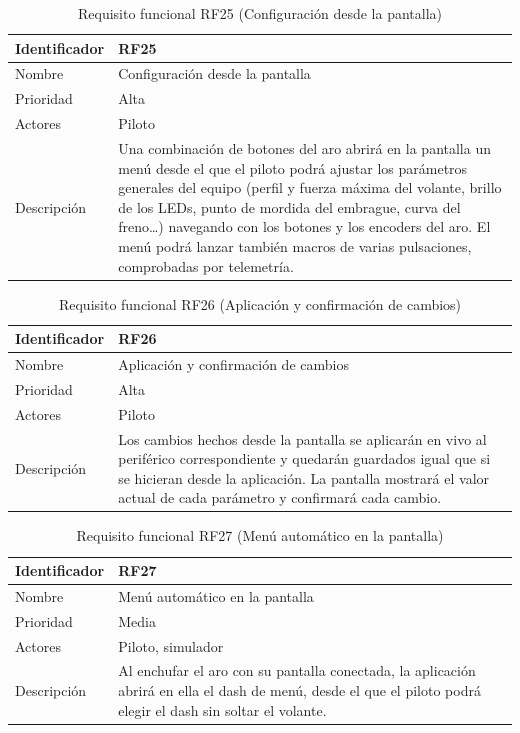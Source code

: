 \begin{table}[H]
	\centering
	\renewcommand{\arraystretch}{2}
	\begin{tabular}{|l|p{10cm}|}
		\hline
		Identificador & RF25 \\
		\hline
		Nombre & Configuración desde la pantalla \\
		\hline
		Prioridad & Alta \\
		\hline
		Actores & Piloto \\
		\hline
		Descripción & Una combinación de botones del aro abrirá en la pantalla un menú desde el que el piloto podrá ajustar los parámetros generales del equipo (perfil y fuerza máxima del volante, brillo de los LEDs, punto de mordida del embrague, curva del freno\ldots) navegando con los botones y los encoders del aro. El menú podrá lanzar también macros de varias pulsaciones, comprobadas por telemetría. \\
		\hline
	\end{tabular}
	\caption{Requisito funcional RF25 (Configuración desde la pantalla)}
	\label{tab:rf25}
\end{table}

\begin{table}[H]
	\centering
	\renewcommand{\arraystretch}{2}
	\begin{tabular}{|l|p{10cm}|}
		\hline
		Identificador & RF26 \\
		\hline
		Nombre & Aplicación y confirmación de cambios \\
		\hline
		Prioridad & Alta \\
		\hline
		Actores & Piloto \\
		\hline
		Descripción & Los cambios hechos desde la pantalla se aplicarán en vivo al periférico correspondiente y quedarán guardados igual que si se hicieran desde la aplicación. La pantalla mostrará el valor actual de cada parámetro y confirmará cada cambio. \\
		\hline
	\end{tabular}
	\caption{Requisito funcional RF26 (Aplicación y confirmación de cambios)}
	\label{tab:rf26}
\end{table}

\begin{table}[H]
	\centering
	\renewcommand{\arraystretch}{2}
	\begin{tabular}{|l|p{10cm}|}
		\hline
		Identificador & RF27 \\
		\hline
		Nombre & Menú automático en la pantalla \\
		\hline
		Prioridad & Media \\
		\hline
		Actores & Piloto, simulador \\
		\hline
		Descripción & Al enchufar el aro con su pantalla conectada, la aplicación abrirá en ella el dash de menú, desde el que el piloto podrá elegir el dash sin soltar el volante. \\
		\hline
	\end{tabular}
	\caption{Requisito funcional RF27 (Menú automático en la pantalla)}
	\label{tab:rf27}
\end{table}

